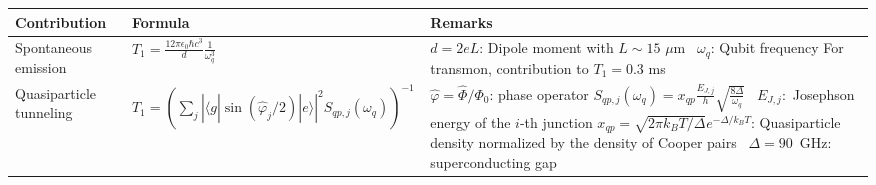 \documentclass[]{article}
\newcommand{\ket}[1]{| #1 \rangle}
\newcommand{\bra}[1]{\langle #1 |}
\begin{document}
\begin{table}[h]
\hspace*{-2cm}
\centering
\begin{tabular}{|p{2cm}|p{5.7cm}|p{7.5cm}|}
	\hline 
Contribution	& Formula & Remarks \\ 
\hline \hline 
Spontaneous emission & $T_1 = \frac{12 \pi \epsilon_0 \hbar c^3}{d} \frac{1}{\omega_q^3}$~\cite{koch2007} & $d=2eL$: Dipole moment with $L\sim 15$ $\mu$m~\cite{koch2007} \newline $\omega_q$: Qubit frequency \newline
For transmon, contribution to $T_1=0.3$ ms~\cite{koch2007} \\
\hline
Quasiparticle tunneling & $T_1 = \left( \sum_j \left| \bra{g} \sin ( \hat{\varphi}_j/2) \ket{e} \right|^{2} S_{qp, j} (\omega_q) \right) ^{-1} $~\cite{catelani2011}& $\hat{\varphi} = \hat{\Phi}/ \Phi_0$: phase operator \newline
$S_{qp, j} (\omega_q) = x_{qp}\frac{E_{J, j}}{h}\sqrt{\frac{8 \Delta}{\omega_q}}$~\cite{yan2016} \newline 
$E_{J,j}:$ Josephson energy of the $i$-th junction \newline
$x_{qp}=\sqrt{2\pi k_B T/ \Delta}e^{-\Delta / k_B T}$: Quasiparticle density normalized by the density of Cooper pairs~\cite{catelani2011PRL} \newline
$\Delta=90$~GHz: superconducting gap~\cite{delta}
\\


\end{tabular}
\end{table}
\end{document}
